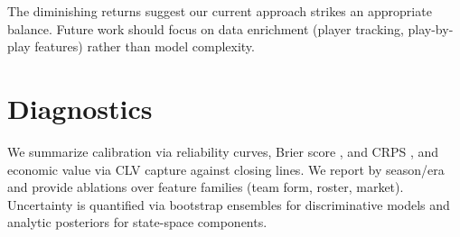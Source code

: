 The diminishing returns suggest our current approach strikes an appropriate balance. Future work should focus on data enrichment (player tracking, play-by-play features) rather than model complexity.





\section{Diagnostics}
We summarize calibration via reliability curves, Brier score \citep{brier1950}, and CRPS \citep{gneiting2007}, and economic value via CLV capture against closing lines. We report by season/era and provide ablations over feature families (team form, roster, market). Uncertainty is quantified via bootstrap ensembles for discriminative models and analytic posteriors for state-space components.

